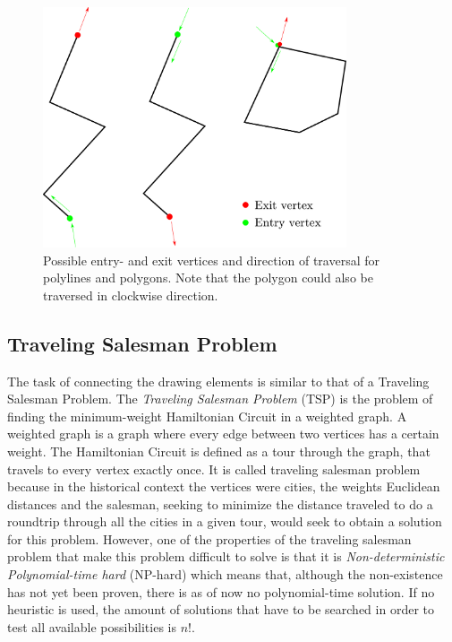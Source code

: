 \begin{figure}
\includegraphics[width=0.8\textwidth]{images/path_planning/traversal.pdf}
\caption{Possible entry- and exit vertices and direction of traversal for polylines and polygons. Note that the polygon could also be traversed in clockwise direction.}
\end{figure}

\subsection{Traveling Salesman Problem}

The task of connecting the drawing elements is similar to that of a Traveling Salesman Problem.
The \textit{Traveling Salesman Problem} (TSP) is the problem of finding the minimum-weight Hamiltonian Circuit in a weighted graph. A weighted graph is a graph where every edge between two vertices has a certain weight. The Hamiltonian Circuit is defined as a tour through the graph, that travels to every vertex exactly once. It is called traveling salesman problem because in the historical context the vertices were cities, the weights Euclidean distances and the salesman, seeking to minimize the distance traveled to do a roundtrip through all the cities in a given tour, would seek to obtain a solution for this problem. However, one of the properties of the traveling salesman problem that make this problem difficult to solve is that it is \textit{Non-deterministic Polynomial-time hard} (NP-hard) which means that, although the non-existence has not yet been proven, there is as of now no polynomial-time solution. If no heuristic is used, the amount of solutions that have to be searched in order to test all available possibilities is $n!$.

